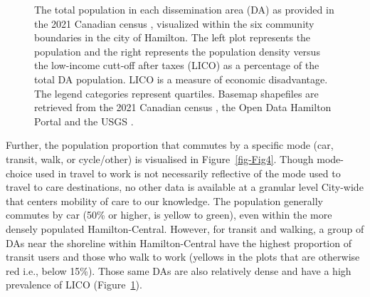 \documentclass[
  authoryear,
  preprint,
  3p]{elsarticle}
\begin{document}
\begin{figure}


\caption{\label{fig-Fig3}The total population in each dissemination area
(DA) as provided in the 2021 Canadian census
\citep{governmentofcanadaCensusPopulation2023}, visualized within the
six community boundaries in the city of Hamilton. The left plot
represents the population and the right represents the population
density versus the low-income cutt-off after taxes (LICO) as a
percentage of the total DA population. LICO is a measure of economic
disadvantage. The legend categories represent quartiles. Basemap
shapefiles are retrieved from the 2021 Canadian census
\citep{governmentofcanadaCensusPopulation2023}, the Open Data Hamilton
Portal \citep{opendatahamiltonCityBoundary2023} and the USGS
\citep{greatlakesUSGS2010}.}

\end{figure}%

Further, the population proportion that commutes by a specific mode
(car, transit, walk, or cycle/other) is visualised in
Figure~\ref{fig-Fig4}. Though mode-choice used in travel to work is not
necessarily reflective of the mode used to travel to care destinations,
no other data is available at a granular level City-wide that centers
mobility of care to our knowledge. The population generally commutes by
car (50\% or higher, is yellow to green), even within the more densely
populated Hamilton-Central. However, for transit and walking, a group of
DAs near the shoreline within Hamilton-Central have the highest
proportion of transit users and those who walk to work (yellows in the
plots that are otherwise red i.e., below 15\%). Those same DAs are also
relatively dense and have a high prevalence of LICO
(Figure~\ref{fig-Fig3}).
\end{document}
